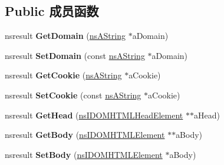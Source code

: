 \subsection*{Public 成员函数}
\begin{DoxyCompactItemize}
\item 
\mbox{\label{interfacens_i_d_o_m_h_t_m_l_document_a26c0b17c9638f00c62c36d5c4696b887}} 
nsresult {\bfseries Get\+Domain} (\hyperlink{structns_string_container}{ns\+A\+String} $\ast$a\+Domain)
\item 
\mbox{\label{interfacens_i_d_o_m_h_t_m_l_document_aa5b00f8823358f34d46b6afc02d4ff46}} 
nsresult {\bfseries Set\+Domain} (const \hyperlink{structns_string_container}{ns\+A\+String} $\ast$a\+Domain)
\item 
\mbox{\label{interfacens_i_d_o_m_h_t_m_l_document_a4b43a75a625699e358a9a74b8d09c8a4}} 
nsresult {\bfseries Get\+Cookie} (\hyperlink{structns_string_container}{ns\+A\+String} $\ast$a\+Cookie)
\item 
\mbox{\label{interfacens_i_d_o_m_h_t_m_l_document_a9ea62c78777d864acab609789ec12925}} 
nsresult {\bfseries Set\+Cookie} (const \hyperlink{structns_string_container}{ns\+A\+String} $\ast$a\+Cookie)
\item 
\mbox{\label{interfacens_i_d_o_m_h_t_m_l_document_a2e051ea187e2b3d10597b05617d67ec0}} 
nsresult {\bfseries Get\+Head} (\hyperlink{interfacens_i_d_o_m_h_t_m_l_head_element}{ns\+I\+D\+O\+M\+H\+T\+M\+L\+Head\+Element} $\ast$$\ast$a\+Head)
\item 
\mbox{\label{interfacens_i_d_o_m_h_t_m_l_document_af9d55494198f1ad830540a7aebd74388}} 
nsresult {\bfseries Get\+Body} (\hyperlink{interfacens_i_d_o_m_h_t_m_l_element}{ns\+I\+D\+O\+M\+H\+T\+M\+L\+Element} $\ast$$\ast$a\+Body)
\item 
\mbox{\label{interfacens_i_d_o_m_h_t_m_l_document_a3a35509934a6178672dcdc8f256adb51}} 
nsresult {\bfseries Set\+Body} (\hyperlink{interfacens_i_d_o_m_h_t_m_l_element}{ns\+I\+D\+O\+M\+H\+T\+M\+L\+Element} $\ast$a\+Body)

\end{DoxyCompactItemize}
